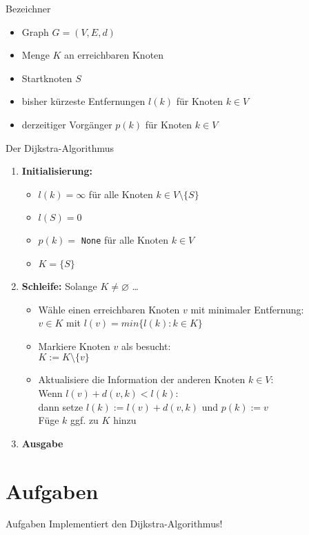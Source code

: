 \begin{frame}{Bezeichner}
	\begin{itemize}
		\item Graph $G = (V, E, d)$
		\item Menge $K$ an erreichbaren Knoten
		\item Startknoten $S$
		\item bisher kürzeste Entfernungen $l(k)$ für Knoten $k \in V$
		\item derzeitiger Vorgänger $p(k)$ für Knoten $k \in V$
	\end{itemize}
\end{frame}


\begin{frame}{Der Dijkstra-Algorithmus}
	\begin{enumerate}
		\item \textbf{Initialisierung:}
			\begin{itemize}
				\item $l(k) = \infty$ für alle Knoten $k \in V \setminus \{S\}$
				\item $l(S) = 0$
				\item $p(k) = $ \texttt{None} für alle Knoten $k \in V$ 
				\item $K = \{S\}$
			\end{itemize}
		\item \textbf{Schleife:} Solange $K \neq \varnothing$ \dots
			\begin{itemize}
				\item Wähle einen erreichbaren Knoten $v$ mit minimaler Entfernung: \\
					$v \in K$ mit $l(v) = min\{l(k) : k \in K\}$
				\item Markiere Knoten $v$ als besucht: \\
					$K := K \setminus \{v\}$
				\item Aktualisiere die Information der anderen Knoten $k \in V$: \\
					Wenn $l(v) + d(v,k) < l(k)$: \\ 
					dann setze $l(k) := l(v) + d(v,k)$ und $p(k) := v$ \\
					Füge $k$ ggf. zu $K$ hinzu
			\end{itemize}
		\item \textbf{Ausgabe}
	\end{enumerate}

\end{frame}




\section{Aufgaben}

\begin{frame}{Aufgaben}
	Implementiert den Dijkstra-Algorithmus!
\end{frame}


